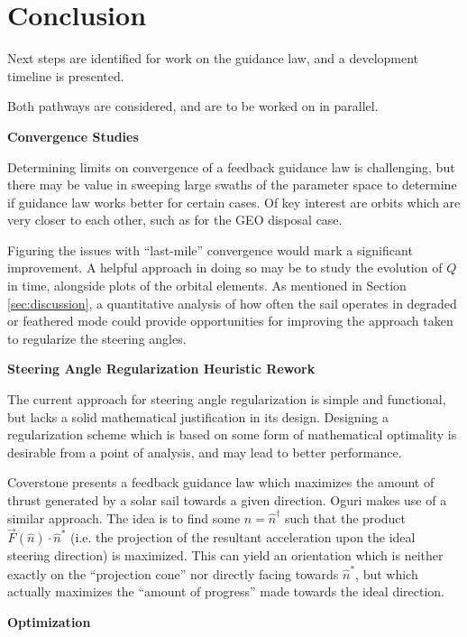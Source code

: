 \chapter{Conclusion}

Next steps are identified for work on the guidance law, and a development timeline is presented.



Both pathways are considered, and are to be worked on in parallel.

\textbf{Convergence Studies}

Determining limits on convergence of a feedback guidance law is challenging, but there may be value in sweeping large swaths of the parameter space to determine if guidance law works better for certain cases. Of key interest are orbits which are very closer to each other, such as for the GEO disposal case.

Figuring the issues with ``last-mile'' convergence would mark a significant improvement. A helpful approach in doing so may be to study the evolution of $Q$ in time, alongside plots of the orbital elements. As mentioned in Section \ref{sec:discussion}, a quantitative analysis of how often the sail operates in degraded or feathered mode could provide opportunities for improving the approach taken to regularize the steering angles.

\textbf{Steering Angle Regularization Heuristic Rework}

The current approach for steering angle regularization is simple and functional, but lacks a solid mathematical justification in its design. Designing a regularization scheme which is based on some form of mathematical optimality is desirable from a point of analysis, and may lead to better performance.

Coverstone \cite{coverstone2003technique} presents a feedback guidance law which maximizes the amount of thrust generated by a solar sail towards a given direction. Oguri \cite{oguri2023solar} makes use of a similar approach. The idea is to find some $\hat{n} = \hat{n}^\dagger$ such that the product $\vec{F}(\hat{n}) \cdot \hat{n}^*$ (i.e. the projection of the resultant acceleration upon the ideal steering direction) is maximized. This can yield an orientation which is neither exactly on the ``projection cone'' nor directly facing towards $\hat{n}^*$, but which actually maximizes the ``amount of progress'' made towards the ideal direction.

\textbf{Optimization}

